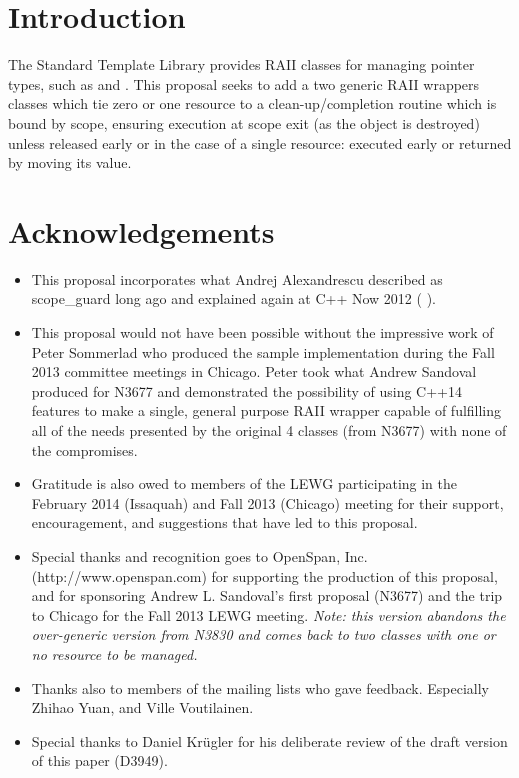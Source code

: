\documentclass[ebook,11pt,article]{memoir}
\begin{document}
\chapter{Introduction}
The Standard Template Library provides RAII classes for managing pointer types, such as  and .  This proposal seeks to add a two generic RAII wrappers classes which tie zero or one resource to a clean-up/completion routine which is bound by scope, ensuring execution at scope exit (as the object is destroyed) unless released early or in the case of a single resource: executed early or returned by moving its value.

\chapter{Acknowledgements}
\begin{itemize}
\item This proposal incorporates what Andrej Alexandrescu described as scope_guard long ago and explained again at C++ Now 2012 (%
).
\item This proposal would not have been possible without the impressive work of Peter Sommerlad who produced the sample implementation during the Fall 2013 committee meetings in Chicago.  Peter took what Andrew Sandoval produced for N3677 and demonstrated the possibility of using C++14 features to make a single, general purpose RAII wrapper capable of fulfilling all of the needs presented by the original 4 classes (from N3677) with none of the compromises.
\item Gratitude is also owed to members of the LEWG participating in the February 2014 (Issaquah) and Fall 2013 (Chicago) meeting for their support, encouragement, and suggestions that have led to this proposal.
\item Special thanks and recognition goes to OpenSpan, Inc. (http://www.openspan.com) for supporting the production of this proposal, and for sponsoring Andrew L. Sandoval's first proposal (N3677) and the trip to Chicago for the Fall 2013 LEWG meeting. \emph{Note: this version abandons the over-generic version from N3830 and comes back to two classes with one or no resource to be managed.}
\item Thanks also to members of the mailing lists who gave feedback. Especially Zhihao Yuan, and Ville Voutilainen.
\item Special thanks to Daniel Kr\"ugler for his deliberate review of the draft version of this paper (D3949).
\end{itemize}
\end{document}

